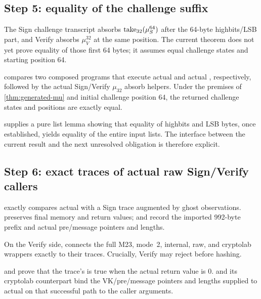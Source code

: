 \subsection{Step 5: equality of the challenge suffix}

The Sign challenge transcript absorbs \(\mathop{\mathrm{take}}_{32}(\mu_S^{64})\) after the
64-byte highbits/LSB part, and Verify absorbs \(\mu_V^{32}\) at the same position.
The current theorem does not yet prove equality of those first 64 bytes;
it assumes equal challenge states and starting position 64.

\begin{verified}
\label{thm:challenge-suffix}
 compares two
composed programs that execute actual  and actual
, respectively, followed by the actual Sign/Verify
\(\mu_{32}\) absorb helpers. Under the premises of \cref{thm:generated-mu} and
initial challenge position 64, the returned challenge states and positions are
exactly equal.
\end{verified}

 supplies a pure
list lemma showing that equality of highbits and LSB bytes, once established,
yields equality of the entire input lists. The interface between the current
result and the next unresolved obligation is therefore explicit.

\subsection{Step 6: exact traces of actual raw Sign/Verify callers}

 exactly compares actual
 with a Sign trace
augmented by ghost observations. 
preserves final memory and return values;
 and
 record the imported 992-byte
prefix and actual pre/message pointers and lengths.

On the Verify side,  connects the full M23,
mode~2, internal, raw, and cryptolab wrappers exactly to their traces.
Crucially, Verify may reject before hashing.

\begin{verified}
\label{thm:verify-accept-tail}
 and
 prove
that the trace's  is true when the actual return value
is 0.  and its
cryptolab counterpart bind the VK/pre/message pointers and lengths supplied to
actual  on that successful path to the caller arguments.
\end{verified}

